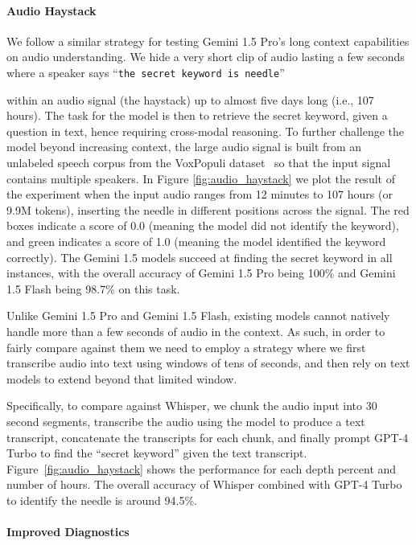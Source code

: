 \paragraph{Audio Haystack} We follow a similar strategy for testing Gemini 1.5 Pro's long context capabilities on audio understanding. We hide a very short clip of audio lasting a few seconds where a speaker says ``\texttt{the secret keyword is needle}'' 

within an audio signal (the haystack) up to almost five days long (i.e., 107 hours). The task for the model is then to retrieve the secret keyword, given a question in text, hence requiring cross-modal reasoning. To further challenge the model beyond increasing context, the large audio signal is built from an unlabeled speech corpus from the VoxPopuli dataset~\cite{wang2021voxpopuli} so that the input signal contains multiple speakers. In Figure \ref{fig:audio_haystack} we plot the result of the experiment when the input audio ranges from 12 minutes to 107 hours (or 9.9M tokens), inserting the needle in different positions across the signal. The red boxes indicate a score of 0.0 (meaning the model did not identify the keyword), and green indicates a score of 1.0 (meaning the model identified the keyword correctly). The Gemini 1.5 models succeed at finding the secret keyword in all instances, with the overall accuracy of Gemini 1.5 Pro being 100\% and Gemini 1.5 Flash being 98.7\% on this task.

Unlike Gemini 1.5 Pro and Gemini 1.5 Flash, existing models cannot natively handle more than a few seconds of audio in the context. As such, in order to fairly compare against them we need to employ a strategy where we first transcribe audio into text using windows of tens of seconds, and then rely on text models to extend beyond that limited window. 

Specifically, to compare against Whisper, we chunk the audio input into 30 second segments, transcribe the audio using the model to produce a text transcript, concatenate the transcripts for each chunk, and finally prompt GPT-4 Turbo to find the ``secret keyword'' given the text transcript. Figure~\ref{fig:audio_haystack} shows the performance for each depth percent and number of hours. The overall accuracy of Whisper combined with GPT-4 Turbo to identify the needle is around 94.5\%.

\paragraph{Improved Diagnostics}

